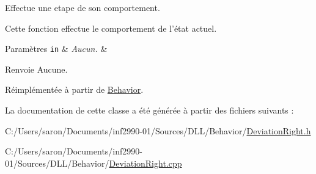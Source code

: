 Effectue une etape de son comportement. 

Cette fonction effectue le comportement de l'état actuel.


\begin{DoxyParams}[1]{Paramètres}
\mbox{\tt in}  & {\em Aucun.} & \\
\hline
\end{DoxyParams}
\begin{DoxyReturn}{Renvoie}
Aucune. 
\end{DoxyReturn}


Réimplémentée à partir de \hyperlink{group__inf2990_gac22f205bc85075ff707ad1f695c18439}{Behavior}.



La documentation de cette classe a été générée à partir des fichiers suivants \-:\begin{DoxyCompactItemize}
\item 
C\-:/\-Users/saron/\-Documents/inf2990-\/01/\-Sources/\-D\-L\-L/\-Behavior/\hyperlink{_deviation_right_8h}{Deviation\-Right.\-h}\item 
C\-:/\-Users/saron/\-Documents/inf2990-\/01/\-Sources/\-D\-L\-L/\-Behavior/\hyperlink{_deviation_right_8cpp}{Deviation\-Right.\-cpp}\end{DoxyCompactItemize}
